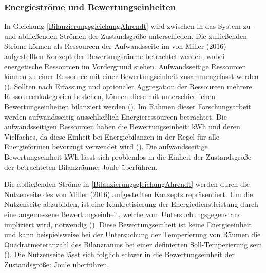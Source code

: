
\subsubsection{Energieströme und Bewertungseinheiten}

In Gleichung \eqref{BilanzierungsgleichungAhrendt} wird zwischen in das System zu- und abfließenden Strömen der Zustandsgröße unterschieden.
Die zufließenden Ströme können als Ressourcen der Aufwandsseite im von Miller (2016) aufgestellten Konzept der Bewertungsräume 
betrachtet werden, wobei energetische Ressourcen im Vordergrund stehen. Aufwandsseitige Ressourcen können zu einer Ressource mit 
einer Bewertungseinheit zusammengefasst werden (\cite[S. 112]{Miller.2016}). Sollten nach Erfassung und optionaler Aggregation der 
Ressourcen mehrere Ressourcenkategorien bestehen, können diese mit unterschiedlichen Bewertungseinheiten bilanziert werden (\cite[S. 112]{Miller.2016}). 
Im Rahmen dieser Forschungsarbeit werden aufwandsseitig ausschließlich Energieressourcen betrachtet.
Die aufwandsseitigen Ressourcen haben die Bewertungseinheit: kWh und deren Vielfaches, da diese Einheit bei Energiebilanzen in der Regel 
für alle Energieformen bevorzugt verwendet wird (\cite[S. 65]{Konstantin.2023}). Die aufwandsseitige Bewertungseinheit kWh lässt sich problemlos in 
die Einheit der Zustandsgröße der betrachteten Bilanzräume: Joule überführen.

Die abfließenden Ströme in \eqref{BilanzierungsgleichungAhrendt} werden durch die Nutzenseite des von Miller (2016) aufgestellten Konzepts repräsentiert.
Um die Nutzenseite abzubilden, ist eine Konkretisierung der Energiedienstleistung durch eine angemessene Bewertungseinheit, welche vom Untersuchungsgegenstand 
impliziert wird, notwendig (\cite{Miller.2016}). Diese Bewertungseinheit ist keine Energieeinheit und kann beispielsweise bei der Untersuchung der Temperierung 
von Räumen die Quadratmeteranzahl des Bilanzraums bei einer definierten Soll-Temperierung sein (\cite{Miller.2016}). Die Nutzenseite lässt sich folglich schwer 
in die Bewertungseinheit der Zustandsgröße: Joule überführen.

